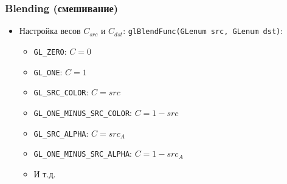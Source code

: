 \documentclass{beamer}
\begin{document}
\begin{frame}[fragile]
\frametitle{Blending (смешивание)}
\begin{itemize}
\item Настройка весов \begin{math}C_{src}\end{math} и \begin{math}C_{dst}\end{math}: \verb|glBlendFunc(GLenum src, GLenum dst)|:
\pause
\begin{itemize}
\item \verb|GL_ZERO|: \begin{math}C = 0\end{math}
\item \verb|GL_ONE|: \begin{math}C = 1\end{math}
\item \verb|GL_SRC_COLOR|: \begin{math}C = src\end{math}
\item \verb|GL_ONE_MINUS_SRC_COLOR|: \begin{math}C = 1 - src\end{math}
\item \verb|GL_SRC_ALPHA|: \begin{math}C = src_A\end{math}
\item \verb|GL_ONE_MINUS_SRC_ALPHA|: \begin{math}C = 1 - src_A\end{math}
\item И т.д.
\end{itemize}
\end{itemize}
\end{frame}
\end{document}
